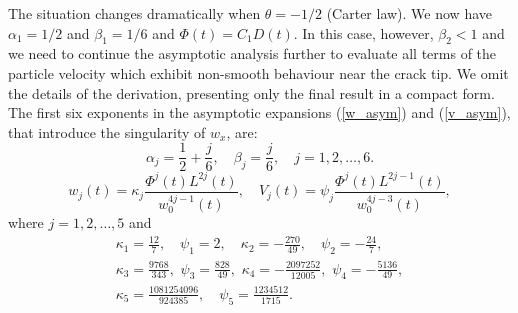 The situation changes dramatically when $\theta=-1/2$ (Carter law). We now have $\alpha_1=1/2$ and $\beta_1=1/6$ and $\Phi(t)=C_1D(t)$. In this case, however, $\beta_2<1$ and we need to continue the asymptotic analysis further to evaluate all terms of the particle velocity which exhibit non-smooth  behaviour near the crack tip. We omit the details of the derivation, presenting only the final result in a compact form.
The first six exponents in the asymptotic expansions (\ref{w_asym}) and (\ref{v_asym}), that introduce the singularity of $w_x$, are:
\[
\alpha_j=\frac{1}{2}+\frac{j}{6},\quad \beta_j=\frac{j}{6},\quad j=1,2,\ldots,6.
\]
\[
w_j(t)=\kappa_j\frac{\Phi^j(t)L^{2j}(t)}{w_0^{4j-1}(t)},\quad V_j(t)=\psi_j\frac{\Phi^j(t)L^{2j-1}(t)}{w_0^{4j-3}(t)},
\]
where $j=1,2,\ldots,5$ and
\[
\begin{array}{l}
\kappa_1=\frac{12}{7},\quad \psi_1=2,\quad \kappa_2=-\frac{270}{49},\quad \psi_2=-\frac{24}{7},
\\[4mm]
\kappa_3=\frac{9768}{343}, \,\, \psi_3=\frac{828}{49},\,\, \kappa_4=-\frac{2097252}{12005},\,\, \psi_4=-\frac{5136}{49},
\\[4mm]
\kappa_5=\frac{1081254096}{924385},\quad \psi_5=\frac{1234512}{1715}.
\end{array}
\]